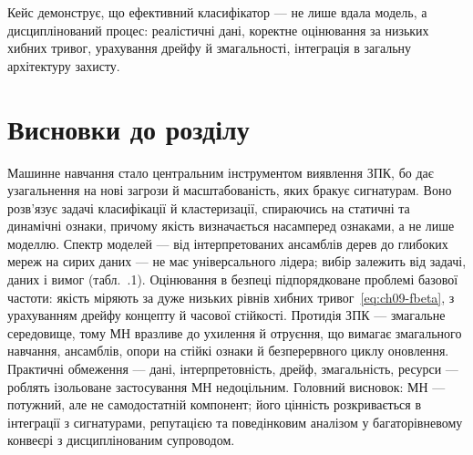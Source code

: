 Кейс демонструє, що ефективний класифікатор --- не лише вдала модель, а дисциплінований процес: реалістичні дані, коректне оцінювання за низьких хибних тривог, урахування дрейфу й змагальності, інтеграція в загальну архітектуру захисту.

\section*{Висновки до розділу}

Машинне навчання стало центральним інструментом виявлення ЗПК, бо дає узагальнення на нові загрози й масштабованість, яких бракує сигнатурам. Воно розв'язує задачі класифікації й кластеризації, спираючись на статичні та динамічні ознаки, причому якість визначається насамперед ознаками, а не лише моделлю. Спектр моделей --- від інтерпретованих ансамблів дерев до глибоких мереж на сирих даних --- не має універсального лідера; вибір залежить від задачі, даних і вимог (табл.~\thechapter.1). Оцінювання в безпеці підпорядковане проблемі базової частоти: якість міряють за дуже низьких рівнів хибних тривог~\eqref{eq:ch09-fbeta}, з урахуванням дрейфу концепту й часової стійкості. Протидія ЗПК --- змагальне середовище, тому МН вразливе до ухилення й отруєння, що вимагає змагального навчання, ансамблів, опори на стійкі ознаки й безперервного циклу оновлення. Практичні обмеження --- дані, інтерпретовність, дрейф, змагальність, ресурси --- роблять ізольоване застосування МН недоцільним. Головний висновок: МН --- потужний, але не самодостатній компонент; його цінність розкривається в інтеграції з сигнатурами, репутацією та поведінковим аналізом у багаторівневому конвеєрі з дисциплінованим супроводом.


